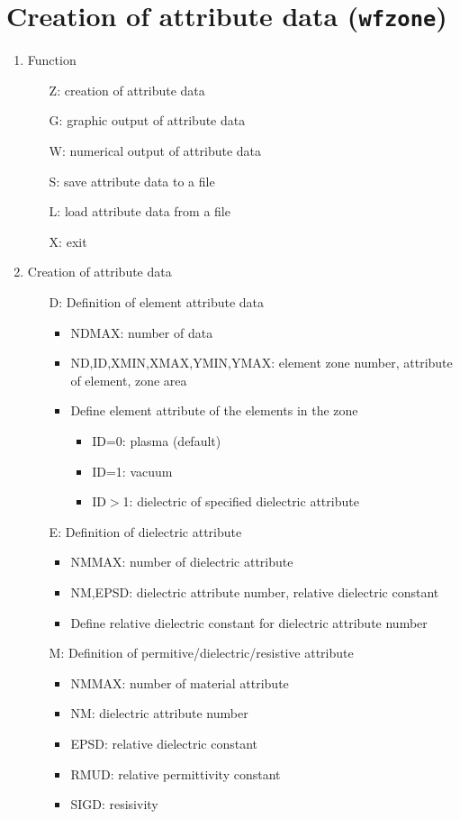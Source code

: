 \section{Creation of attribute data ({\tt wfzone})}
\begin{enumerate}
\item
Function
\begin{itemize}
\item[Z:]
creation of attribute data
\item[G:]
graphic output of attribute data
\item[W:]
numerical output of attribute data
\item[S:]
save attribute data to a file
\item[L:]
load attribute data from a file
\item[X:]
exit
\end{itemize}

\item
Creation of attribute data
\begin{itemize}
\item[D:]
Definition of element attribute data
\begin{itemize}
\item
NDMAX: number of data
\item
ND,ID,XMIN,XMAX,YMIN,YMAX: element zone number, attribute of element,
zone area
\item
Define element attribute of the elements in the zone
\begin{itemize}
\item
ID=0: plasma (default)
\item
ID=1: vacuum
\item
ID$>$1: dielectric of specified dielectric attribute
\end{itemize}
\end{itemize}

\item[E:]
Definition of dielectric attribute
\begin{itemize}
\item
NMMAX: number of dielectric attribute
\item
NM,EPSD: dielectric attribute number, relative dielectric constant
\item
Define relative dielectric constant for dielectric attribute number
\end{itemize}

\item[M:]
Definition of permitive/dielectric/resistive attribute
\begin{itemize}
\item
NMMAX: number of material attribute
\item
NM: dielectric attribute number
\item
EPSD: relative dielectric constant
\item
RMUD: relative permittivity constant
\item
SIGD: resisivity
\end{itemize}


\end{itemize}
\end{enumerate}
